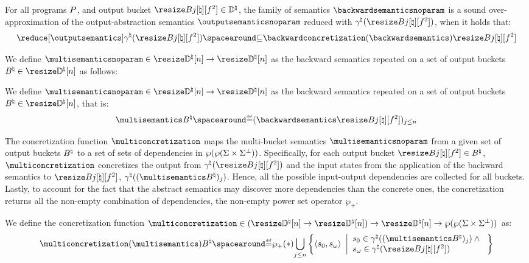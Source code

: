 
\begin{definition}
  For all programs $P$, and output bucket $\bucket\in\abstractdomain$, the family of semantics $\backwardsemanticsnoparam$ is a \textup{sound over-approximation} of the output-abstraction semantics $\outputsemanticsnoparam$ reduced with  $\abstractdomainconcretization(\bucket)$, when it holds that:
  \[\reducedoutputsemantics \SubseteQ \backwardconcretization(\backwardsemantics)\bucket\]
\end{definition}

We define
$\multisemanticsnoparam\in\multitype$ as the backward semantics repeated on a set of output buckets $\buckets\in\vectorbuckets$ as follows:

\begin{definition}
  We define
$\multisemanticsnoparam\in\multitype$ as the backward semantics repeated on a set of output buckets $\buckets\in\vectorbuckets$, that is:
\begin{align*}
\multisemantics\buckets \DefeQ (\backwardsemantics\bucket)_{j\le n}
\end{align*}
\end{definition}


The concretization function $\multiconcretization$ maps the multi-bucket semantics $\multisemanticsnoparam$ from a given set of output buckets $B^\natural$ to a set of sets of dependencies in $\wp(\wp(\Sigma\times\Sigma^\bot))$.
Specifically, for each output bucket $\bucket\in\buckets$, $\multiconcretization$ concretizes the output from $\abstractdomainconcretization(\bucket)$ and the input states from the application of the backward semantics to $\bucket$, \ie{} $\abstractdomainconcretization((\multisemantics\buckets)_j)$.
Hence, all the possible input-output dependencies are collected for all buckets.
Lastly, to account for the fact that the abstract semantics may discover more dependencies than the concrete ones, the concretization returns all the non-empty combination of dependencies, \cf{} the non-empty power set operator $\wp_{+}$.
\begin{definition}
  We define the concretization function $\multiconcretization\in(\multitype)\to\vectorbuckets\to\outputtype$ as:
\begin{gather*}
  \multiconcretization(\multisemantics)\buckets \DefeQ
  \nonemptysetof*{\bigsetjoin_{j\le n} \bigsetdef{\inputoutputtuple{\defstate}}{\retrieveinput{\defstate}\in\abstractdomainconcretization((\multisemantics\buckets)_j) \land{} \\ \retrieveoutput{\defstate}\in\abstractdomainconcretization(\bucket)}}
\end{gather*}
\end{definition}


